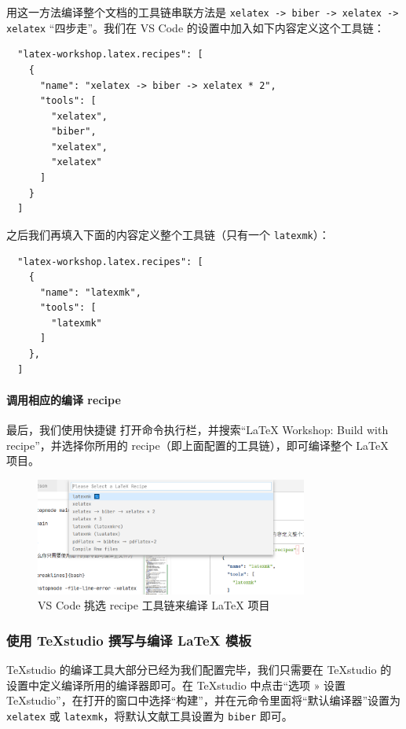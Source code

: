 用这一方法编译整个文档的工具链串联方法是 \texttt{xelatex -> biber -> xelatex -> xelatex} “四步走”。我们在 VS Code 的设置中加入如下内容定义这个工具链：

\begin{verbatim}
  "latex-workshop.latex.recipes": [
    {
      "name": "xelatex -> biber -> xelatex * 2",
      "tools": [
        "xelatex",
        "biber",
        "xelatex",
        "xelatex"
      ]
    }
  ]
\end{verbatim}

之后我们再填入下面的内容定义整个工具链（只有一个 \texttt{latexmk}）：

\begin{verbatim}
  "latex-workshop.latex.recipes": [
    {
      "name": "latexmk",
      "tools": [
        "latexmk"
      ]
    },
  ]
\end{verbatim}

\paragraph{调用相应的编译 recipe}
最后，我们使用快捷键  打开命令执行栏，并搜索“LaTeX Workshop: Build with recipe”，并选择你所用的 recipe（即上面配置的工具链），即可编译整个 {\LaTeX} 项目。

\begin{figure}[H]
  \centering
  \includegraphics[width=0.8\textwidth]{images/vscode_build_recipe.png}
  \caption{VS Code 挑选 recipe 工具链来编译 {\LaTeX} 项目}
\end{figure}

\subsubsection{使用 \TeX studio 撰写与编译 {\LaTeX} 模板}

\TeX studio 的编译工具大部分已经为我们配置完毕，我们只需要在 \TeX studio 的设置中定义编译所用的编译器即可。在 \TeX studio 中点击“选项 » 设置 TeXstudio”，在打开的窗口中选择“构建”，并在元命令里面将“默认编译器”设置为 \texttt{xelatex} 或 \texttt{latexmk}，将默认文献工具设置为 \texttt{biber} 即可。

